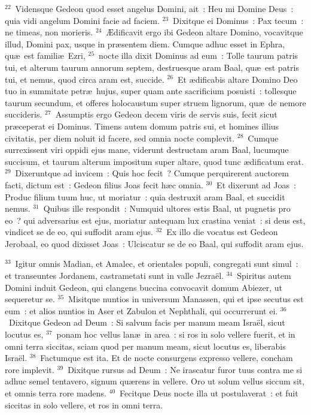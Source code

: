 ${}^{22}$~Vidensque Gedeon quod esset angelus Domini, ait~: Heu mi Domine Deus~: quia vidi angelum Domini facie ad faciem.
${}^{23}$~Dixitque ei Dominus~: Pax tecum~: ne timeas, non morieris.
${}^{24}$~\AE dificavit ergo ibi Gedeon altare Domino, vocavitque illud, Domini pax, usque in pr\ae sentem diem. Cumque adhuc esset in Ephra, qu\ae\ est famili\ae\ Ezri,
${}^{25}$~nocte illa dixit Dominus ad eum~: Tolle taurum patris tui, et alterum taurum annorum septem, destruesque aram Baal, qu\ae\ est patris tui, et nemus, quod circa aram est, succide.
${}^{26}$~Et \ae dificabis altare Domino Deo tuo in summitate petr\ae\ hujus, super quam ante sacrificium posuisti~: tollesque taurum secundum, et offeres holocaustum super struem lignorum, qu\ae\ de nemore succideris.
${}^{27}$~Assumptis ergo Gedeon decem viris de servis suis, fecit sicut pr\ae ceperat ei Dominus. Timens autem domum patris sui, et homines illius civitatis, per diem noluit id facere, sed omnia nocte complevit.
${}^{28}$~Cumque surrexissent viri oppidi ejus mane, viderunt destructam aram Baal, lucumque succisum, et taurum alterum impositum super altare, quod tunc \ae dificatum erat.
${}^{29}$~Dixeruntque ad invicem~: Quis hoc fecit~? Cumque perquirerent auctorem facti, dictum est~: Gedeon filius Joas fecit h\ae c omnia.
${}^{30}$~Et dixerunt ad Joas~: Produc filium tuum huc, ut moriatur~: quia destruxit aram Baal, et succidit nemus.
${}^{31}$~Quibus ille respondit~: Numquid ultores estis Baal, ut pugnetis pro eo~? qui adversarius est ejus, moriatur antequam lux crastina veniat~: si deus est, vindicet se de eo, qui suffodit aram ejus.
${}^{32}$~Ex illo die vocatus est Gedeon Jerobaal, eo quod dixisset Joas~: Ulciscatur se de eo Baal, qui suffodit aram ejus.


${}^{33}$~Igitur omnis Madian, et Amalec, et orientales populi, congregati sunt simul~: et transeuntes Jordanem, castrametati sunt in valle Jezra\"el.
${}^{34}$~Spiritus autem Domini induit Gedeon, qui clangens buccina convocavit domum Abiezer, ut sequeretur se.
${}^{35}$~Misitque nuntios in universum Manassen, qui et ipse secutus est eum~: et alios nuntios in Aser et Zabulon et Nephthali, qui occurrerunt ei.
${}^{36}$~Dixitque Gedeon ad Deum~: Si salvum facis per manum meam Isra\"el, sicut locutus es,
${}^{37}$~ponam hoc vellus lan\ae\ in area~: si ros in solo vellere fuerit, et in omni terra siccitas, sciam quod per manum meam, sicut locutus es, liberabis Isra\"el.
${}^{38}$~Factumque est ita. Et de nocte consurgens expresso vellere, concham rore implevit.
${}^{39}$~Dixitque rursus ad Deum~: Ne irascatur furor tuus contra me si adhuc semel tentavero, signum qu\ae rens in vellere. Oro ut solum vellus siccum sit, et omnis terra rore madens.
${}^{40}$~Fecitque Deus nocte illa ut postulaverat~: et fuit siccitas in solo vellere, et ros in omni terra.

